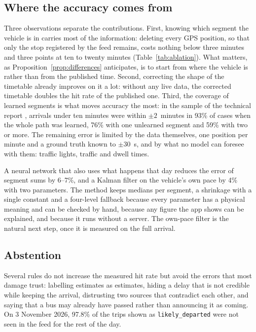 
\subsection{Where the accuracy comes from}

Three observations separate the contributions. First, knowing which segment the vehicle is in carries most of the
information: deleting every GPS position, so that only the stop registered by the feed remains, costs nothing below
three minutes and three points at ten to twenty minutes (Table~\ref{tab:ablation}). What matters, as
Proposition~\ref{prop:differences} anticipates, is to start from where the vehicle is rather than from the published
time. Second, correcting the shape of the timetable already improves on it a lot: without any live data, the corrected
timetable doubles the hit rate of the published one. Third, the coverage of learned segments is what moves accuracy the
most: in the sample of the technical report \parencite{garrido2026memoria}, arrivals under ten minutes were within $\pm2$~minutes in 93\% of cases when the
whole path was learned, 76\% with one unlearned segment and 59\% with two or more. The remaining error is limited by the
data themselves, one position per minute and a ground truth known to $\pm30$~s, and by what no model can foresee with
them: traffic lights, traffic and dwell times.

A neural network that also uses what happens that day reduces the error of segment sums by 6--7\%, and a Kalman filter
on the vehicle's own pace by 4\% with two parameters. The method keeps medians per segment, a shrinkage with a single
constant and a four-level fallback because every parameter has a physical meaning and can be checked by hand, because
any figure the app shows can be explained, and because it runs without a server. The own-pace filter is the natural
next step, once it is measured on the full arrival.

\subsection{Abstention}

Several rules do not increase the measured hit rate but avoid the errors that most damage trust: labelling estimates
as estimates, hiding a delay that is not credible while keeping the arrival, distrusting two sources that contradict
each other, and saying that a bus may already have passed rather than announcing it as coming. On 3 November 2026,
97.8\% of the trips shown as \texttt{likely\_departed} were not seen in the feed for the rest of the day.

